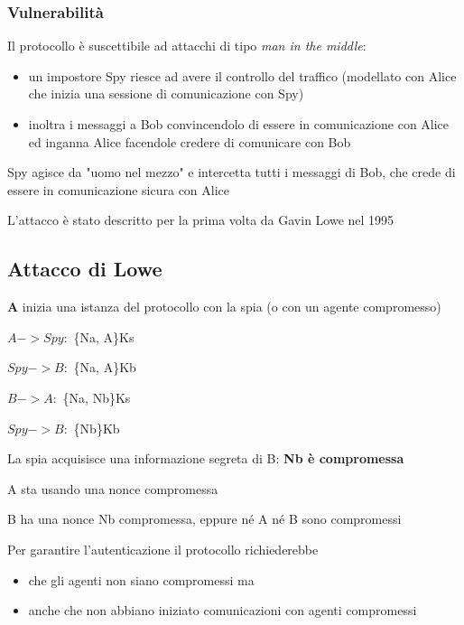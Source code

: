 \subsubsection{Vulnerabilità}
\noindent Il protocollo è suscettibile ad attacchi di tipo \textit{man in the middle}:
\begin{itemize}
    \item un impostore Spy riesce ad avere il controllo del traffico (modellato con Alice che inizia una sessione di comunicazione con Spy)
    \item inoltra i messaggi a Bob convincendolo di essere in comunicazione con Alice ed inganna Alice facendole credere di comunicare con Bob     
\end{itemize}

\noindent Spy agisce da "uomo nel mezzo" e intercetta tutti i messaggi di Bob, che crede di essere in
comunicazione sicura con Alice

\noindent L'attacco è stato descritto per la prima volta da Gavin Lowe nel 1995

\subsection{Attacco di Lowe}
\noindent \textbf{A} inizia una istanza del protocollo con la spia (o con un agente compromesso)
\begin{center}
    $A-> Spy :$ \{Na, A\}Ks
    
    $Spy->B :$ \{Na, A\}Kb
    
    $B->A :$ \{Na, Nb\}Ks
    
    $Spy->B :$ \{Nb\}Kb
\end{center}

\noindent La spia acquisisce una informazione segreta di B: \textbf{Nb è compromessa}

\noindent A sta usando una nonce compromessa

\noindent B ha una nonce Nb compromessa, eppure né A né B sono compromessi

\noindent Per garantire l'autenticazione il protocollo richiederebbe
\begin{itemize}
    \item che gli agenti non siano compromessi ma
    \item anche che non abbiano iniziato comunicazioni
    con agenti compromessi
\end{itemize}

